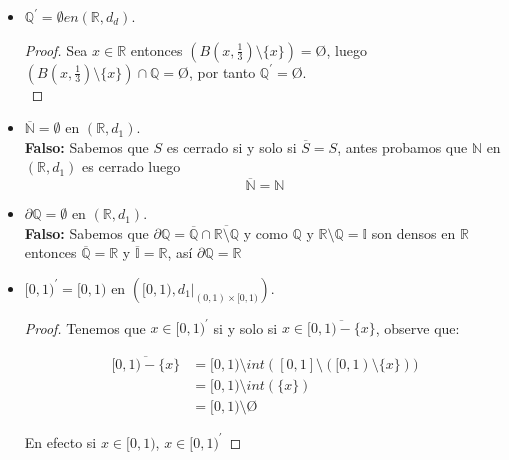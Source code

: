 \begin{itemize}[leftmargin=*]
    \item $\mathbb{Q}^{\prime}=\emptyset e n\left(\mathbb{R}, d_d\right)$.\\
    
    \begin{proof}
        Sea $x \in \mathbb{R}$ entonces $(B(x,\frac{1}{3})\setminus \{x\})=\text{\O}$, luego $(B(x,\frac{1}{3})\setminus \{x\})\cap \mathbb{Q}=$\O, por tanto $\mathbb{Q}^{\prime}=$\O.\\ 
    \end{proof}


    \item  $\overline{\mathbb{N}}=\emptyset$ en $\left(\mathbb{R}, d_1\right)$.\\
    
    \textbf{Falso: }Sabemos que $S$ es cerrado si y solo si $\overline{S}=S$, antes probamos que $\mathbb{N}$ en $(\mathbb{R},d_1)$ es cerrado luego $$\overline{\mathbb{N}}=\mathbb{N}$$


    \item  $\partial \mathbb{Q}=\emptyset$ en $\left(\mathbb{R}, d_1\right)$.\\
 
    \textbf{Falso: }Sabemos que $\partial \mathbb{Q}=$$\overline{\mathbb{Q}}\cap$$\overline{\mathbb{R}\setminus\mathbb{Q}}$ y como $\mathbb{Q}$ y $\mathbb{R}\setminus\mathbb{Q}=\mathbb{I}$ son densos en $\mathbb{R}$ entonces $\overline{\mathbb{Q}}=\mathbb{R}$ y $\overline{\mathbb{I}}=\mathbb{R}$, así $\partial \mathbb{Q}=\mathbb{R}$


    \item $[0,1)^{\prime}=[0,1)$ en $\left([0,1),\left.d_1\right|_{(0,1) \times[0,1)}\right)$.\\

    \begin{proof}
        Tenemos que $x \in [0,1)^{\prime}$ si y solo si $x \in \overline{[0,1)-\{x\}}$, observe que:
        
        \begin{align*}
            \overline{[0,1)-\{x\}}&=[0,1)\setminus int([0,1]\setminus ([0,1)\setminus \{x\}))\\
            &=[0,1)\setminus int(\{x\})\\
            &=[0,1)\setminus \text{\O}
        \end{align*}
        
        En efecto si $x\in [0,1)$, $x \in [0,1)^{\prime}$ 
    \end{proof}


\end{itemize}
